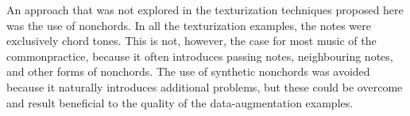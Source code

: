 
An approach that was not explored in the texturization
techniques proposed here was the use of \gls{nonchord}s. In
all the texturization examples, the notes were exclusively
chord tones. This is not, however, the case for most music
of the \gls{commonpractice}, because it often introduces
passing notes, neighbouring notes, and other forms of
\gls{nonchord}s. The use of synthetic \gls{nonchord}s was
avoided because it naturally introduces additional problems,
but these could be overcome and result beneficial to the
quality of the data-augmentation examples.
